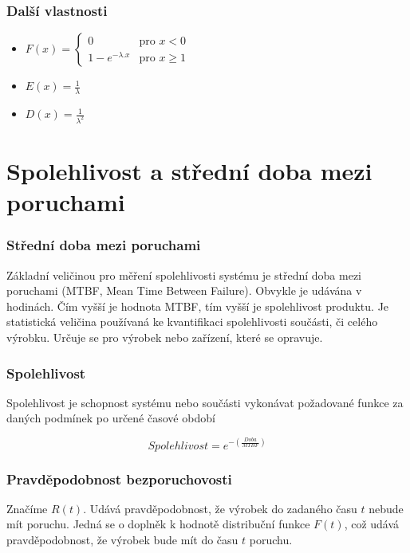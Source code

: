\documentclass[FM,RP]{tulthesis}
\begin{document}
        \subsubsection*{Další vlastnosti}
        \begin{itemize} 
        \item
            $  F(x) = \left\{ \begin{array}{ll}
                0 & \mbox{pro }x<0 \\
                1-e^{-\lambda.x} & \mbox{pro }x\geq 1
                \end{array} \right. $
        \item
            $ E(x) = \frac{1}{\lambda}  $
        \item
            $ D(x) = \frac{1}{\lambda^{2}}  $

        \end{itemize}

    \section{Spolehlivost a střední doba mezi poruchami}
        \subsubsection{Střední doba mezi poruchami}
            Základní veličinou pro měření spolehlivosti systému je střední doba mezi poruchami (MTBF, Mean Time
            Between Failure). Obvykle je udávána v hodinách. Čím vyšší je hodnota MTBF, tím vyšší je spolehlivost
            produktu.\cite{3}
            Je statistická veličina používaná ke kvantifikaci spolehlivosti součásti, či celého výrobku.
            Určuje se pro výrobek nebo zařízení, které se opravuje. \cite{3}
        \subsubsection{Spolehlivost}
            Spolehlivost je schopnost systému nebo součásti vykonávat požadované funkce za daných
            podmínek po určené časové období \cite{4} 

            $$ Spolehlivost = e^{-(\frac{Doba}{MTBF})}$$

        \subsubsection{Pravděpodobnost bezporuchovosti}
            Značíme $ R(t) $. Udává pravděpodobnost, že výrobek do zadaného času $ t $ nebude mít poruchu. Jedná se o doplněk k hodnotě distribuční funkce $ F(t) $,
            což udává pravděpodobnost, že výrobek bude mít do času $ t $ poruchu.\cite{5}
\end{document}
